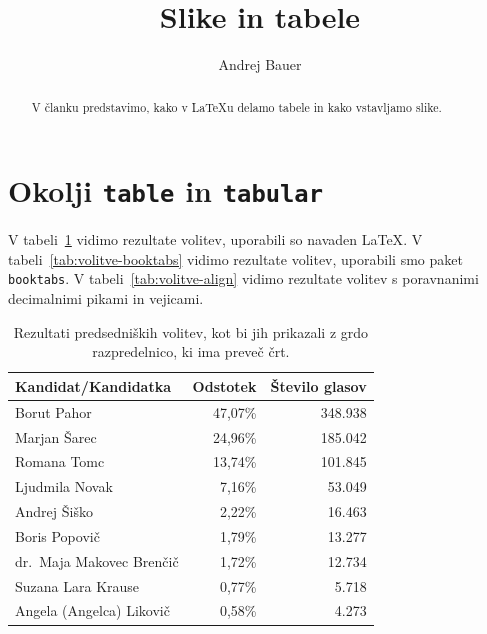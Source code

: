 \documentclass{article}
\title{Slike in tabele}
\author{Andrej Bauer}
\begin{document}
\maketitle

\begin{abstract}
  V članku predstavimo, kako v {\LaTeX}u delamo tabele in kako vstavljamo slike.
\end{abstract}

\section{Okolji \texttt{table} in \texttt{tabular}}
\label{sec:okolje-texttttabular}

V tabeli~\ref{tab:volitve-vanilla} vidimo rezultate volitev, uporabili so navaden {\LaTeX}.
V tabeli~\ref{tab:volitve-booktabs} vidimo rezultate volitev, uporabili smo paket \texttt{booktabs}.
V tabeli~\ref{tab:volitve-align} vidimo rezultate volitev s poravnanimi decimalnimi pikami in vejicami.


\begin{table}[htp]
  \centering
  \begin{tabular}{|l|r|r|}
  \hline
  \textbf{Kandidat/Kandidatka}        & \textbf{Odstotek} & \textbf{Število glasov} \\ \hline
  Borut Pahor                & 47,07\%  & 348.938 \\ \hline
  Marjan Šarec               & 24,96\%  & 185.042 \\ \hline
  Romana Tomc                & 13,74\%  & 101.845 \\ \hline
  Ljudmila Novak             & 7,16\%   & 53.049 \\ \hline
  Andrej Šiško               & 2,22\%   & 16.463 \\ \hline
  Boris Popovič              & 1,79\%   & 13.277 \\ \hline
  dr.\ Maja Makovec Brenčič  & 1,72\%   & 12.734 \\ \hline
  Suzana Lara Krause         & 0,77\%   & 5.718 \\ \hline
  Angela (Angelca) Likovič   & 0,58\%   & 4.273 \\ \hline
  \end{tabular}
  \caption{Rezultati predsedniških volitev, kot bi jih prikazali z grdo razpredelnico, ki ima preveč črt.}
  \label{tab:volitve-vanilla}
\end{table}
\end{document}
